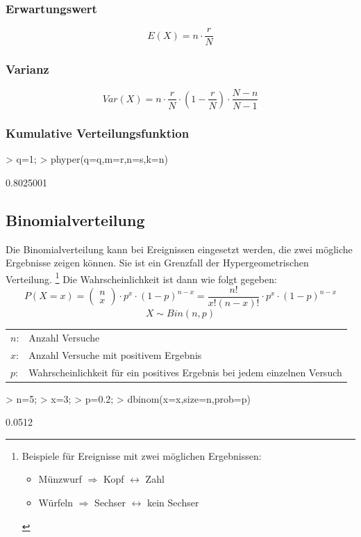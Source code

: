 \subsubsection{Erwartungswert}
\[ E(X) = n \cdot \frac{r}{N} \]
\subsubsection{Varianz}
\[ Var(X) = n \cdot \frac{r}{N} \cdot \left(1 - \frac{r}{N}\right) 
\cdot \frac{N - n}{N - 1} \]

\subsubsection{Kumulative Verteilungsfunktion}
\begin{Schunk}
\begin{Sinput}
> q=1;
> phyper(q=q,m=r,n=s,k=n)
\end{Sinput}
\begin{Soutput}
[1] 0.8025001
\end{Soutput}
\end{Schunk}

\subsection{Binomialverteilung}
Die Binomialverteilung kann bei Ereignissen eingesetzt werden, die zwei 
mögliche Ergebnisse zeigen können. Sie ist ein Grenzfall der 
Hypergeometrischen Verteilung. 
\footnote{Beispiele für Ereignisse mit zwei möglichen Ergebnissen: 
  \begin{itemize} 
    \item Münzwurf $\Rightarrow$ Kopf $\leftrightarrow$ Zahl
    \item Würfeln $\Rightarrow$ Sechser $\leftrightarrow$ kein Sechser
  \end{itemize}}
Die Wahrscheinlichkeit ist dann wie folgt gegeben: 
\[ P(X=x) = 
\left( \begin{array}{c}n\\x\end{array} \right) \cdot p^x \cdot (1-p)^{n-x} 
= \frac{n!}{x! (n-x)!} \cdot p^x \cdot (1-p)^{n-x} \]
\[ X \sim Bin(n,p) \]
\begin{tabular}{@{}ll}
  $n$: & Anzahl Versuche \\
  $x$: & Anzahl Versuche mit positivem Ergebnis \\
  $p$: & Wahrscheinlichkeit für ein positives Ergebnis bei jedem einzelnen Versuch
\end{tabular} 
\begin{Schunk}
\begin{Sinput}
> n=5;
> x=3;
> p=0.2;
> dbinom(x=x,size=n,prob=p)
\end{Sinput}
\begin{Soutput}
[1] 0.0512
\end{Soutput}
\end{Schunk}


